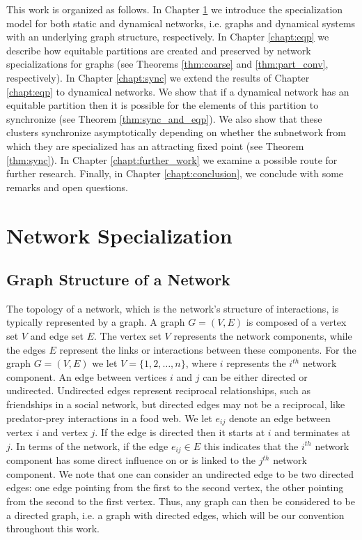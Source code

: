 \documentclass[12pt]{thesis}
\begin{document}
This work is organized as follows. In Chapter \ref{chapt:net_spec} we introduce the specialization model for both static and dynamical networks, i.e. graphs and dynamical systems with an underlying graph structure, respectively.
In Chapter \ref{chapt:eqp} we describe how equitable partitions are created and preserved by network specializations for graphs (see Theorems \ref{thm:coarse} and \ref{thm:part_conv}, respectively).
In Chapter \ref{chapt:sync} we extend the results of Chapter \ref{chapt:eqp} to dynamical networks.
We show that if a dynamical network has an equitable partition then it is possible for the elements of this partition to synchronize (see Theorem \ref{thm:sync_and_eqp}).
We also show that these clusters synchronize asymptotically depending on whether the subnetwork from which they are specialized has an attracting fixed point (see Theorem \ref{thm:sync}).
In Chapter \ref{chapt:further_work} we examine a possible route for further research.
Finally, in Chapter \ref{chapt:conclusion}, we conclude with some remarks and open questions.


\chapter{Network Specialization}\label{chapt:net_spec}

\section{Graph Structure of a Network}

The topology of a network, which is the network's structure of interactions, is typically represented by a graph.
A {graph} $G=(V,E)$ is composed of a {vertex set} $V$ and {edge set} $E$.
The vertex set $V$ represents the network {components}, while the edges $E$ represent the links or {interactions} between these components.
For the graph $G=(V,E)$ we let $V=\{1,2,\dots,n\}$, where $i$ represents the $i^{th}$ network component.
An edge between vertices $i$ and $j$ can be either directed or undirected.
Undirected edges represent reciprocal relationships, such as
friendships in a social network, but directed edges may not be a reciprocal, like predator-prey interactions in a food web.
We let $e_{ij}$ denote an edge between vertex $i$ and vertex $j$.
If the edge is directed then it starts at $i$ and terminates at $j$.
In terms of the network, if the edge $e_{ij} \in E$ this indicates that the $i^{th}$ network component has some direct influence on or is linked to the $j^{th}$ network component.
We note that one can consider an undirected edge to be two directed edges: one edge pointing from the first to the second vertex, the other pointing from the second to the first vertex.
Thus, any graph can then be considered to be a directed graph, i.e. a graph with directed edges, which will be our convention throughout this work.
\end{document}
